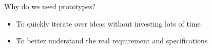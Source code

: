 Why do we need prototypes?
\begin{itemize}
    \item To quickly iterate over ideas without investing lots of time
    \item To better understand the real requirement and specifications
\end{itemize}
